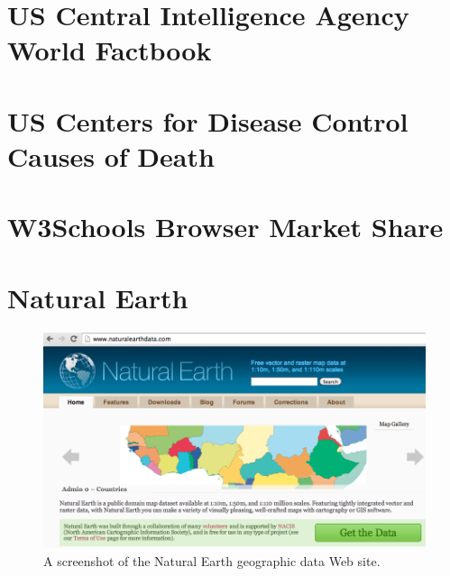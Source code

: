 \section{US Central Intelligence Agency World Factbook}
\section{US Centers for Disease Control Causes of Death}
\section{W3Schools Browser Market Share}
\section{Natural Earth}
\begin{figure}[h]
  \caption{A screenshot of the Natural Earth geographic data Web site.}
  \centering
  \includegraphics[width=\textwidth]{figures/naturalEarth.png}
\end{figure}
